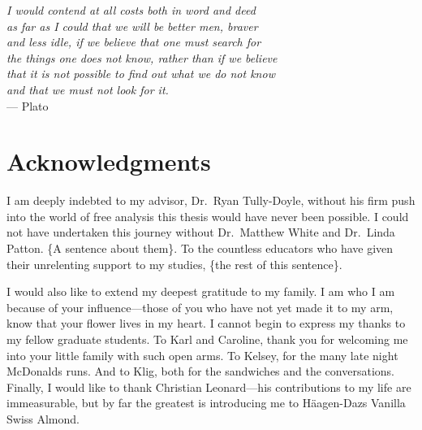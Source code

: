 
\begin{flushright}{\slshape
    I would contend at all costs both in word and deed\\
    as far as I could that we will be better men, braver\\
    and less idle, if we believe that one must search for \\
    the things one does not know, rather than if we believe \\
    that it is not possible to find out what we do not know \\
    and that we must not look for it.} \\ \medskip
    --- Plato
\end{flushright}



\bigskip

\begingroup
\let\clearpage\relax
\let\cleardoublepage\relax
\let\cleardoublepage\relax
\chapter*{Acknowledgments}

I am deeply indebted to my advisor, Dr.\ Ryan Tully-Doyle, without his firm
push into the world of free analysis this thesis would have never been possible.
I could not have undertaken this journey without Dr.\ Matthew White and Dr.\
Linda Patton. \{A sentence about them\}. To the countless educators who have given their unrelenting
support to my studies, \{the rest of this sentence\}.

\bigskip
I would also like to extend my deepest gratitude to my family. I am who I am
because of your influence---those of you who
have not yet made it to my arm, know that your flower lives in my heart.
I cannot begin to express my thanks to my fellow graduate students. To Karl and
Caroline, thank you for welcoming me into your little family with such open
arms. To Kelsey, for the many late night McDonalds runs. And to Klig, both for
the sandwiches and the conversations.
Finally, I would like to thank Christian Leonard---his contributions to my life
are immeasurable, but by far the greatest is introducing me to H\"aagen-Dazs
Vanilla Swiss Almond.

\endgroup
